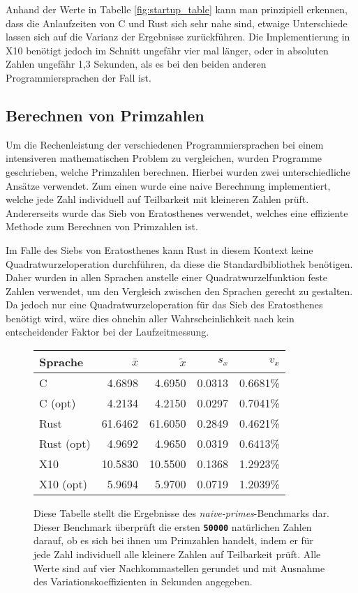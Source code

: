 Anhand der Werte in Tabelle \ref{fig:startup_table} kann man prinzipiell erkennen,
dass die Anlaufzeiten von C und Rust sich sehr nahe sind, etwaige Unterschiede lassen sich auf die Varianz der
Ergebnisse zurückführen. Die Implementierung in X10 benötigt jedoch im Schnitt ungefähr vier mal länger, oder in
absoluten Zahlen ungefähr 1,3 Sekunden, als es bei den beiden anderen Programmiersprachen der Fall ist. 


\subsection{Berechnen von Primzahlen}\label{sec:primes_calc}

Um die Rechenleistung der verschiedenen Programmiersprachen bei einem intensiveren mathematischen Problem zu 
vergleichen, wurden Programme geschrieben, welche Primzahlen berechnen.
Hierbei wurden zwei unterschiedliche Ansätze verwendet. Zum einen wurde
eine naive Berechnung implementiert, welche jede Zahl individuell auf Teilbarkeit mit kleineren Zahlen prüft. 
Andererseits wurde das Sieb von Eratosthenes verwendet, welches eine effiziente Methode zum Berechnen von Primzahlen
ist.

Im Falle des Siebs von Eratosthenes kann Rust in diesem Kontext keine Quadratwurzeloperation durchführen,
da diese die Standardbibliothek benötigen. Daher wurden in allen Sprachen anstelle einer Quadratwurzelfunktion
feste Zahlen verwendet, um den Vergleich zwischen den Sprachen gerecht zu gestalten.
Da jedoch nur eine Quadratwurzeloperation für das Sieb des Eratosthenes
benötigt wird, wäre dies ohnehin aller Wahrscheinlichkeit nach kein entscheidender Faktor bei der Laufzeitmessung.

\begin{figure}[hb]
	\begin{center}
		\begin{tabular}{lrrrr}
			\toprule
			Sprache    & $\bar{x}$ & $\tilde{x}$ & $s_x$ & $v_x$   \\
			\midrule
			C          &  4.6898  & 4.6950  & 0.0313 & 0.6681\% \\
			C (opt)    &  4.2134  & 4.2150  & 0.0297 & 0.7041\% \\
			Rust       & 61.6462  & 61.6050 & 0.2849 & 0.4621\% \\
			Rust (opt) &  4.9692  &  4.9650 & 0.0319 & 0.6413\% \\
			X10        & 10.5830  & 10.5500 & 0.1368 & 1.2923\% \\
			X10 (opt)  &  5.9694  &  5.9700 & 0.0719 & 1.2039\% \\
			\bottomrule
		\end{tabular}
	\end{center}
	\caption{
		Diese Tabelle stellt die Ergebnisse des \textit{naive-primes}-Benchmarks dar.
		Dieser Benchmark überprüft die ersten \texttt{\textsc{\textbf{50000}}} natürlichen Zahlen darauf,
		ob es sich bei ihnen um Primzahlen handelt,
		indem er für jede Zahl individuell alle kleinere Zahlen auf Teilbarkeit prüft.
		Alle Werte sind auf vier Nachkommastellen gerundet und mit Ausnahme des Variationskoeffizienten
		in Sekunden angegeben.
	}
	\label{fig:primes_naive_table}
\end{figure}

